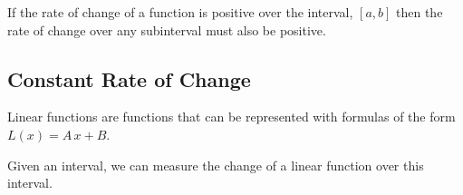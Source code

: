 \documentclass{ximera}
\begin{document}
\begin{question}


If the rate of change of a function is positive over the interval, $[a,b]$ then the rate of change over any subinterval must also be positive.
    \begin{multipleChoice}
    \end{multipleChoice}
\end{question}























\subsection*{Constant Rate of Change}


Linear functions are functions that can be represented with formulas of the form $L(x) = A \, x + B$. 


Given an interval, we can measure the change of a linear function over this interval. 
\end{document}
